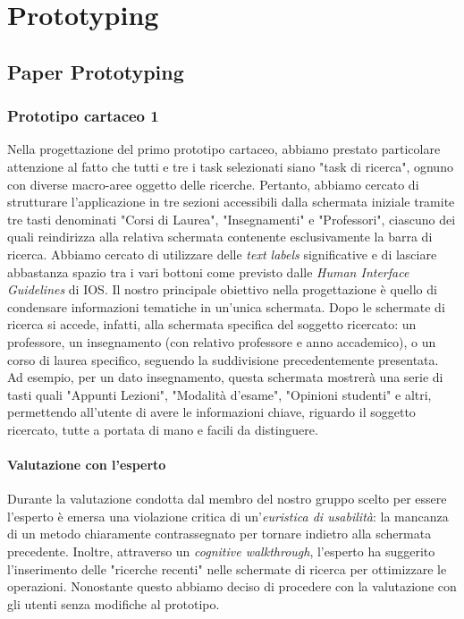 \chapter{Prototyping}

\section{Paper Prototyping}

\subsection{Prototipo cartaceo 1}
Nella progettazione del primo prototipo cartaceo, abbiamo prestato particolare attenzione al fatto che tutti e tre i task selezionati
siano "task di ricerca", ognuno con diverse macro-aree oggetto delle ricerche. Pertanto, abbiamo cercato di strutturare l'applicazione
in tre sezioni accessibili dalla schermata iniziale tramite tre tasti denominati "Corsi di Laurea", "Insegnamenti" e "Professori", ciascuno
dei quali reindirizza alla relativa schermata contenente esclusivamente la barra di ricerca. 
Abbiamo cercato di utilizzare delle \textit{text labels} significative e di lasciare abbastanza spazio tra i vari bottoni come previsto dalle \textit{Human Interface Guidelines} di IOS.
Il nostro principale obiettivo nella progettazione è quello di condensare informazioni tematiche in un'unica schermata. Dopo le schermate
di ricerca si accede, infatti, alla schermata specifica del soggetto ricercato: un professore, un insegnamento (con relativo professore e
anno accademico), o un corso di laurea specifico, seguendo la suddivisione precedentemente presentata. Ad esempio, per un dato insegnamento,
questa schermata mostrerà una serie di tasti quali "Appunti Lezioni", "Modalità d'esame", "Opinioni studenti" e altri, permettendo all'utente
di avere le informazioni chiave, riguardo il soggetto ricercato, tutte a portata di mano e facili da distinguere.


\subsubsection{Valutazione con l'esperto}
Durante la valutazione condotta dal membro del nostro gruppo scelto per essere l'esperto è emersa una violazione critica di un'\textit{euristica di
usabilità}: la mancanza di un metodo chiaramente contrassegnato per tornare indietro alla schermata precedente.
Inoltre, attraverso un \textit{cognitive walkthrough}, l'esperto ha suggerito l'inserimento delle "ricerche recenti" nelle schermate di ricerca per ottimizzare le operazioni.
Nonostante questo abbiamo deciso di procedere con la valutazione con gli utenti senza modifiche al prototipo.


